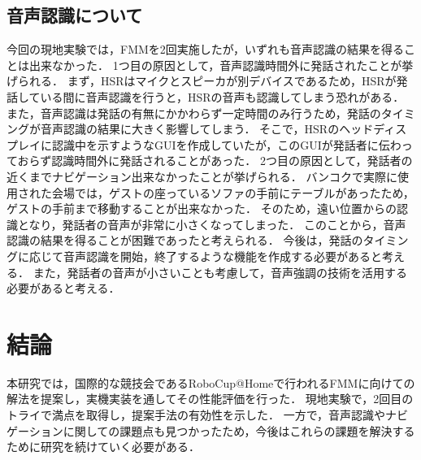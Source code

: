 \documentclass[a4j]{jarticle}
\begin{document}
\subsection{音声認識について}
今回の現地実験では，FMMを2回実施したが，いずれも音声認識の結果を得ることは出来なかった．
1つ目の原因として，音声認識時間外に発話されたことが挙げられる．
まず，HSRはマイクとスピーカが別デバイスであるため，HSRが発話している間に音声認識を行うと，HSRの音声も認識してしまう恐れがある．
また，音声認識は発話の有無にかかわらず一定時間のみ行うため，発話のタイミングが音声認識の結果に大きく影響してしまう．
そこで，HSRのヘッドディスプレイに認識中を示すようなGUIを作成していたが，このGUIが発話者に伝わっておらず認識時間外に発話されることがあった．
2つ目の原因として，発話者の近くまでナビゲーション出来なかったことが挙げられる．
バンコクで実際に使用された会場では，ゲストの座っているソファの手前にテーブルがあったため，ゲストの手前まで移動することが出来なかった．
そのため，遠い位置からの認識となり，発話者の音声が非常に小さくなってしまった．
このことから，音声認識の結果を得ることが困難であったと考えられる．
今後は，発話のタイミングに応じて音声認識を開始，終了するような機能を作成する必要があると考える．
また，発話者の音声が小さいことも考慮して，音声強調\cite{voice_enhancement_1, voice_enhancement_2}の技術を活用する必要があると考える．


\section{結論}
本研究では，国際的な競技会であるRoboCup@Homeで行われるFMMに向けての解法を提案し，実機実装を通してその性能評価を行った．
現地実験で，2回目のトライで満点を取得し，提案手法の有効性を示した．
一方で，音声認識やナビゲーションに関しての課題点も見つかったため，今後はこれらの課題を解決するために研究を続けていく必要がある．
\end{document}
